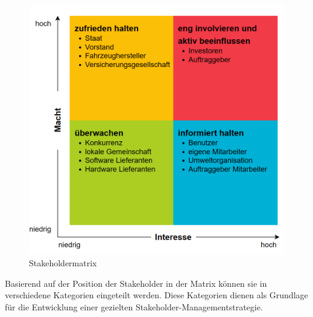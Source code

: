 \begin{figure} [H]
    \centering
    \includegraphics{pictures/Stakeholdermatrix}
    \caption{Stakeholdermatrix}
    \label{fig:stakeholdermatrix}
\end{figure}

Basierend auf der Position der Stakeholder in der Matrix können sie in verschiedene Kategorien eingeteilt werden.
Diese Kategorien dienen als Grundlage für die Entwicklung einer gezielten Stakeholder-Managementstrategie.
